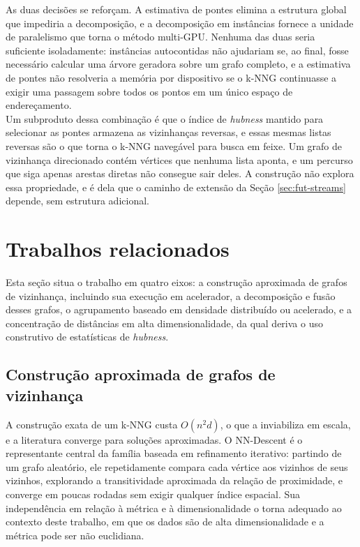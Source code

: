 As duas decisões se reforçam. A estimativa de pontes elimina a estrutura global que impediria a decomposição, e a decomposição em instâncias fornece a unidade de paralelismo que torna o método multi-GPU. Nenhuma das duas seria suficiente isoladamente: instâncias autocontidas não ajudariam se, ao final, fosse necessário calcular uma árvore geradora sobre um grafo completo, e a estimativa de pontes não resolveria a memória por dispositivo se o \ac{k-NNG} continuasse a exigir uma passagem sobre todos os pontos em um único espaço de endereçamento.\\

Um subproduto dessa combinação é que o índice de \textit{hubness} mantido para selecionar as pontes armazena as vizinhanças reversas, e essas mesmas listas reversas são o que torna o \ac{k-NNG} navegável para busca em feixe. Um grafo de vizinhança direcionado contém vértices que nenhuma lista aponta, e um percurso que siga apenas arestas diretas não consegue sair deles. A construção não explora essa propriedade, e é dela que o caminho de extensão da Seção \ref{sec:fut-streams} depende, sem estrutura adicional.\\

\section{Trabalhos relacionados\label{sec:related-work}}

Esta seção situa o trabalho em quatro eixos: a construção aproximada de grafos de vizinhança, incluindo sua execução em acelerador, a decomposição e fusão desses grafos, o agrupamento baseado em densidade distribuído ou acelerado, e a concentração de distâncias em alta dimensionalidade, da qual deriva o uso construtivo de estatísticas de \textit{hubness}.\\

\subsection{Construção aproximada de grafos de vizinhança\label{sec:rel-knng}}

A construção exata de um \ac{k-NNG} custa $O(n^2 d)$, o que a inviabiliza em escala, e a literatura converge para soluções aproximadas. O NN-Descent \cite{nndescent} é o representante central da família baseada em refinamento iterativo: partindo de um grafo aleatório, ele repetidamente compara cada vértice aos vizinhos de seus vizinhos, explorando a transitividade aproximada da relação de proximidade, e converge em poucas rodadas sem exigir qualquer índice espacial. Sua independência em relação à métrica e à dimensionalidade o torna adequado ao contexto deste trabalho, em que os dados são de alta dimensionalidade e a métrica pode ser não euclidiana.\\

